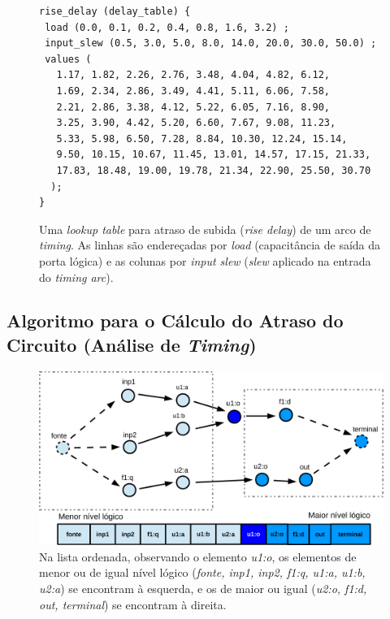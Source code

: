 \documentclass[
	12pt,				%
	openright,			%
	twoside,			%
	a4paper,			%
	english,			%
	french,				%
	spanish,			%
	brazil,				%
	]{abntex2}
\begin{document}
\begin{figure}[ht]
\caption{\label{fig:lookup_table}Uma \textit{lookup table} para atraso de subida (\textit{rise delay}) de um arco de \textit{timing}. As linhas são endereçadas por \textit{load} (capacitância de saída da porta lógica) e as colunas por \textit{input slew} (\textit{slew} aplicado na entrada do \textit{timing arc}). }
\begin{center}
\lstset{basicstyle=\footnotesize}
\begin{lstlisting}[frame=single]
rise_delay (delay_table) {
 load (0.0, 0.1, 0.2, 0.4, 0.8, 1.6, 3.2) ;
 input_slew (0.5, 3.0, 5.0, 8.0, 14.0, 20.0, 30.0, 50.0) ;
 values (
   1.17, 1.82, 2.26, 2.76, 3.48, 4.04, 4.82, 6.12,
   1.69, 2.34, 2.86, 3.49, 4.41, 5.11, 6.06, 7.58,
   2.21, 2.86, 3.38, 4.12, 5.22, 6.05, 7.16, 8.90,
   3.25, 3.90, 4.42, 5.20, 6.60, 7.67, 9.08, 11.23,
   5.33, 5.98, 6.50, 7.28, 8.84, 10.30, 12.24, 15.14,
   9.50, 10.15, 10.67, 11.45, 13.01, 14.57, 17.15, 21.33,
   17.83, 18.48, 19.00, 19.78, 21.34, 22.90, 25.50, 30.70
  );
}

\end{lstlisting}
\end{center}

\end{figure}



\subsection{Algoritmo para o Cálculo do Atraso do Circuito (Análise de \textit{Timing})}

\begin{figure}[ht]
\begin{center}
\caption{\label{fig:grafo_lista_nivel_logico}Na lista ordenada, observando o elemento \textit{u1:o}, os elementos de menor ou de igual  nível lógico (\textit{fonte, inp1, inp2, f1:q, u1:a, u1:b, u2:a}) se encontram à esquerda, e os de maior ou igual (\textit{u2:o, f1:d, out, terminal}) se encontram à direita.}
\includegraphics[width=\linewidth]{img/grafo_lista_nivel_logico.pdf} 

\end{center}
\end{figure}
\end{document}
